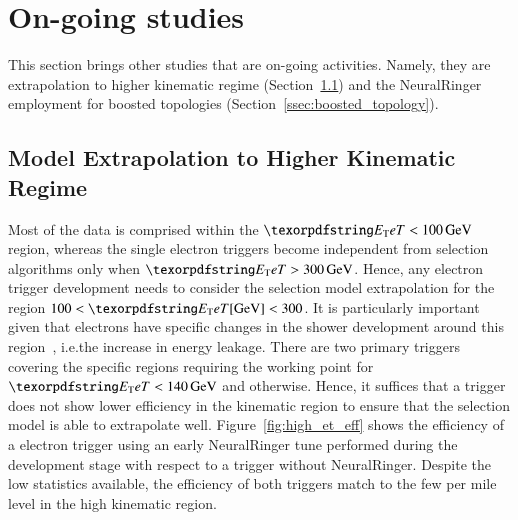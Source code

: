 \section{On-going studies}%
\label{sec:other_ana}


This section brings other studies that are on-going activities. Namely, they are
extrapolation to higher kinematic regime
(Section~\ref{ssec:kinematic_extrapolation}) and the NeuralRinger employment for
boosted topologies (Section~\ref{ssec:boosted_topology}).

\subsection{Model Extrapolation to Higher Kinematic Regime}%
\label{ssec:kinematic_extrapolation}


Most of the \Zee{} \tnp{} data is comprised within the $\et{}<\SI{100}{\GeV}$
region, whereas the single electron triggers become independent from
selection algorithms only when $\et{}>\SI{300}{\GeV}$. Hence, any electron trigger
development needs to consider the selection model extrapolation for the region
$100<\et{} [\text{\GeV}]<300$. It is particularly important given that electrons
have specific changes in the shower development around this
region~\cite{atlas_electron_id_offline}, i.e.\@ the increase in \emiii{} energy
leakage. There are two primary triggers covering the specific regions requiring
the \medium{} working point for $\et{}<\SI{140}{\GeV}$ and \vloose{} otherwise.
Hence, it suffices that a \medium{} trigger does not show lower efficiency in
the kinematic region to ensure that the selection model is able to extrapolate
well. Figure~\ref{fig:high_et_eff} shows the efficiency of a \medium{} electron
trigger using an early NeuralRinger tune performed during the development stage with
respect to a trigger without NeuralRinger. Despite the low statistics available, the
efficiency of both triggers match to the few per mile level in the high
kinematic region.




